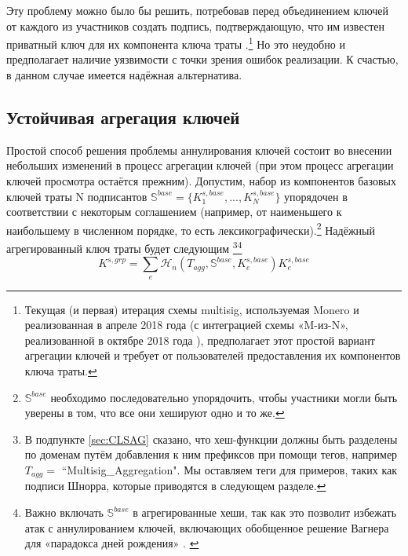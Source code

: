 Эту проблему можно было бы решить, потребовав перед объединением ключей от каждого из участников создать подпись, подтверждающую, что им известен приватный ключ для их компонента ключа траты \cite{old-multisig-mrl-note}.\footnote{Текущая (и первая) итерация схемы multisig, используемая Monero и реализованная в апреле 2018 года \cite{lithiumluna-v7} (с интеграцией схемы «M-из-N», реализованной в октябре 2018 года \cite{berylliumbullet-v8}), предполагает этот простой вариант агрегации ключей и требует от пользователей предоставления их компонентов ключа траты.} Но это неудобно и предполагает наличие уязвимости с точки зрения ошибок реализации. К счастью, в данном случае имеется надёжная альтернатива.%


\subsection{Устойчивая агрегация ключей}
\label{sec:robust-key-aggregation}

Простой способ решения проблемы аннулирования ключей состоит во внесении небольших изменений в процесс агрегации ключей (при этом процесс агрегации ключей просмотра оста\-ётся прежним). Допустим, набор из компонентов базовых ключей траты N подписантов $\mathbb{S}^{base} = \{K^{s,base}_1,...,K^{s,base}_N\}$ упорядочен в соответствии с некоторым соглашением (например, от наименьшего к наибольшему в численном порядке, то есть лексикографически).\footnote{$\mathbb{S}^{base}$ необходимо последовательно упорядочить, чтобы участники могли быть уверены в том, что все они хешируют одно и то же.} Надёж\-ный агрегированный ключ траты будет следующим \cite{MRL-0009-multisig}\footnote{В подпункте \ref{sec:CLSAG} сказано, что хеш-функции должны быть разделены по доменам путём добавления к ним префиксов при помощи тегов, например $T_{agg} =$ ``Multisig\_Aggregation". Мы оставляем теги для примеров, таких как подписи Шнорра, которые приводятся в следующем разделе.}\footnote{Важно включать $\mathbb{S}^{base}$ в агрегированные хеши, так как это позволит избежать атак с аннулированием ключей, включающих обобщенное решение Вагнера для «парадокса дней рождения» \cite{generalized-birthday-wagner}. \cite{adam-wagnerian-tragedies} \cite{maxwell2018simple-musig}}\vspace{.175cm}
\[K^{s,grp} = \sum_e \mathcal{H}_n(T_{agg},\mathbb{S}^{base},K^{s,base}_e)K^{s,base}_e\]

